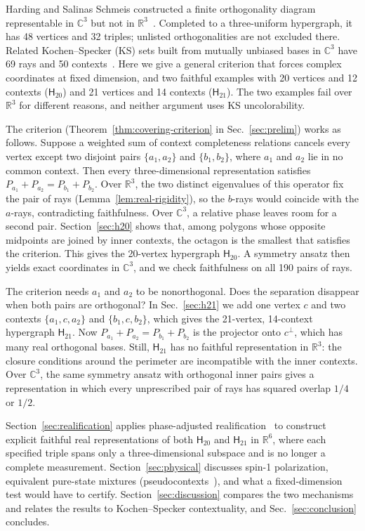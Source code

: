 \documentclass[twocolumn,aps,pra,floatfix,amsmath,amssymb,longbibliography]{revtex4-2}
\newenvironment{handrewrite}{\leavevmode\color{blue}}{}
\theoremstyle{definition}
\theoremstyle{remark}
\newcommand{\C}{\mathbb C}
\newcommand{\R}{\mathbb R}
\newcommand{\Htwenty}{\mathsf H_{20}}
\newcommand{\Htwentyone}{\mathsf H_{21}}
\begin{document}
\begin{handrewrite}
Harding and Salinas Schmeis constructed a finite orthogonality diagram representable in $\C^3$ but not in $\R^3$~\cite{harding2025remarksIJTP}.  Completed to a three-uniform hypergraph, it has 48 vertices and 32 triples; unlisted orthogonalities are not excluded there.  Related Kochen--Specker (KS) sets built from mutually unbiased bases in $\C^3$ have 69 rays and 50 contexts~\cite{svozil-2025-MYOCHS}.  Here we give a general criterion that forces complex coordinates at fixed dimension, and two faithful examples with 20 vertices and 12 contexts ($\Htwenty$) and 21 vertices and 14 contexts ($\Htwentyone$).  The two examples fail over $\R^3$ for different reasons, and neither argument uses KS uncolorability.

The criterion (Theorem~\ref{thm:covering-criterion} in Sec.~\ref{sec:prelim}) works as follows.  Suppose a weighted sum of context completeness relations cancels every vertex except two disjoint pairs $\{a_1,a_2\}$ and $\{b_1,b_2\}$, where $a_1$ and $a_2$ lie in no common context.  Then every three-dimensional representation satisfies $P_{a_1}+P_{a_2}=P_{b_1}+P_{b_2}$.  Over $\R^3$, the two distinct eigenvalues of this operator fix the pair of rays (Lemma~\ref{lem:real-rigidity}), so the $b$-rays would coincide with the $a$-rays, contradicting faithfulness.  Over $\C^3$, a relative phase leaves room for a second pair.  Section~\ref{sec:h20} shows that, among polygons whose opposite midpoints are joined by inner contexts, the octagon is the smallest that satisfies the criterion.  This gives the 20-vertex hypergraph $\Htwenty$.  A symmetry ansatz then yields exact coordinates in $\C^3$, and we check faithfulness on all 190 pairs of rays.

The criterion needs $a_1$ and $a_2$ to be nonorthogonal.  Does the separation disappear when both pairs are orthogonal?  In Sec.~\ref{sec:h21} we add one vertex $c$ and two contexts $\{a_1,c,a_2\}$ and $\{b_1,c,b_2\}$, which gives the 21-vertex, 14-context hypergraph $\Htwentyone$.  Now $P_{a_1}+P_{a_2}=P_{b_1}+P_{b_2}$ is the projector onto $c^\perp$, which has many real orthogonal bases.  Still, $\Htwentyone$ has no faithful representation in $\R^3$: the closure conditions around the perimeter are incompatible with the inner contexts.  Over $\C^3$, the same symmetry ansatz with orthogonal inner pairs gives a representation in which every unprescribed pair of rays has squared overlap $1/4$ or $1/2$.

Section~\ref{sec:realification} applies phase-adjusted realification~\cite{svozil-2025-rvc} to construct explicit faithful real representations of both $\Htwenty$ and $\Htwentyone$ in $\R^6$, where each specified triple spans only a three-dimensional subspace and is no longer a complete measurement.  Section~\ref{sec:physical} discusses spin-1 polarization, equivalent pure-state mixtures (pseudocontexts~\cite{2026-Navara-Svozil-pseudocontexts}), and what a fixed-dimension test would have to certify.  Section~\ref{sec:discussion} compares the two mechanisms and relates the results to Kochen--Specker contextuality, and Sec.~\ref{sec:conclusion} concludes.
\end{handrewrite}
\end{document}
